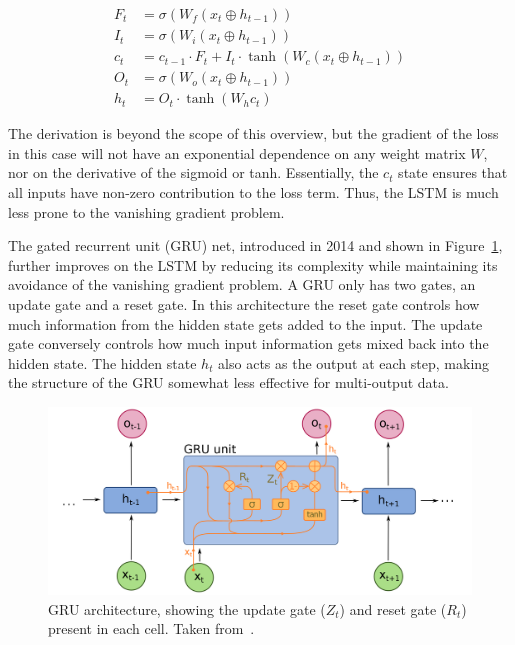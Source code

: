 \begin{align}
    F_t &= \sigma(W_f (x_t \oplus h_{t-1})) \\
    I_t &= \sigma(W_i (x_t \oplus h_{t-1})) \\
    c_t &= c_{t-1} \cdot F_t + I_t \cdot\tanh(W_c (x_t \oplus h_{t-1})) \\
    O_t &= \sigma(W_o (x_t \oplus h_{t-1})) \\
    h_t &= O_t \cdot\tanh(W_h c_t)
\end{align}

The derivation is beyond the scope of this overview, but the gradient of the loss in this case will not have an exponential dependence on any weight matrix $W$, nor on the derivative of the sigmoid or tanh. Essentially, the $c_t$ state ensures that all inputs have non-zero contribution to the loss term. Thus, the LSTM is much less prone to the vanishing gradient problem.

The gated recurrent unit (GRU) net, introduced in 2014 and shown in Figure~\ref{fig:GRU_diagram}, further improves on the LSTM by reducing its complexity while maintaining its avoidance of the vanishing gradient problem. A GRU only has two gates, an update gate and a reset gate. In this architecture the reset gate controls how much information from the hidden state gets added to the input. The update gate conversely controls how much input information gets mixed back into the hidden state. The hidden state $h_t$ also acts as the output at each step, making the structure of the GRU somewhat less effective for multi-output data.

\begin{figure}[htbp]
    \centering
    \includegraphics[width=\linewidth]{Images/ML/GRU.png}
    \caption{GRU architecture, showing the update gate ($Z_t$) and reset gate ($R_t$) present in each cell. Taken from~\cite{GRUDiagram}.}
    \label{fig:GRU_diagram}
\end{figure}

